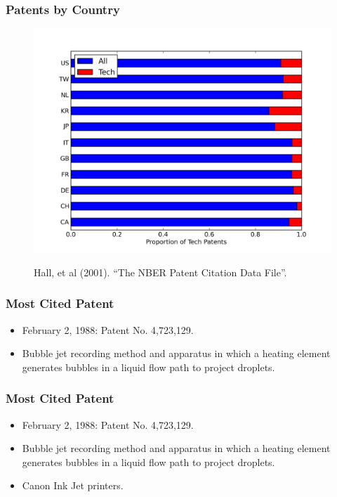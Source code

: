 \documentclass{beamer}
\begin{document}
\begin{frame}[t]\frametitle{Patents by Country} 
\fontsize{6pt}{7.2}\selectfont
\!\!\!\!\!\!\!\!\!\!\!\!\!
\begin{figure}[T]
  \begin{center}
    \includegraphics[scale=.5]{by_country_normalized.png}
    \label{fig:by_country_normalized}
  \end{center}
  \!\!\!\!\!
  Hall, et al (2001). ``The NBER Patent Citation Data File''.

\end{figure}
\end{frame}

\begin{frame}[t]\frametitle{Most Cited Patent} 
  \begin{itemize}
    \item<+-> February 2, 1988: Patent No. 4,723,129.
    \item<+-> Bubble jet recording method and apparatus in which a heating element generates bubbles in a liquid flow path to project droplets.
  \end{itemize}
\end{frame}


\begin{frame}[t]\frametitle{Most Cited Patent} 
  \begin{itemize}
    \item February 2, 1988: Patent No. 4,723,129.
    \item Bubble jet recording method and apparatus in which a heating element generates bubbles in a liquid flow path to project droplets.
    \item Canon Ink Jet printers.
  \end{itemize}
\end{frame}
\end{document}

